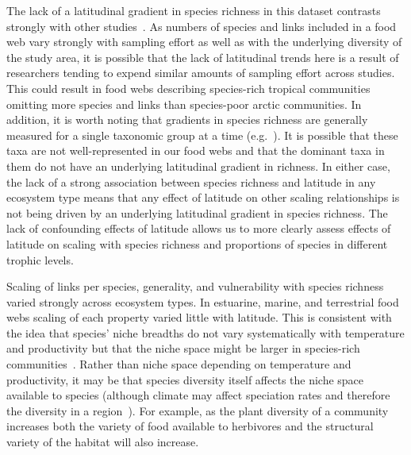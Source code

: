 \documentclass[12pt]{article}
\begin{document}
  The lack of a latitudinal gradient in species richness in this dataset
  contrasts strongly with other
  studies~\citep{Schemske2009,Macpherson2002,Kaufman1995}. As numbers of
  species and links included in a food web vary strongly with sampling effort
  as well as with the underlying diversity of the study area, it is possible
  that the lack of latitudinal trends here is a result of researchers tending
  to expend similar amounts of sampling effort across studies. This could
  result in food webs describing species-rich tropical communities omitting
  more species and links than species-poor arctic communities. In addition, it
  is worth noting that gradients in species richness are generally measured
  for a single taxonomic group at a time
  (e.g.~\citep{Schemske2009,Macpherson2002,Kaufman1995}). It is possible that
  these taxa are not well-represented in our food webs and that the dominant
  taxa in them do not have an underlying latitudinal gradient in richness.  In
  either case, the lack of a strong association between species richness and
  latitude in any ecosystem type means that any effect of latitude on other
  scaling  relationships is not being driven by an underlying  latitudinal
  gradient in species richness. The lack of confounding effects of latitude
  allows us to  more clearly assess effects of latitude on scaling with
  species richness and proportions of species in different  trophic levels.


  Scaling of links per species, generality, and vulnerability with species
  richness varied strongly across ecosystem types. In estuarine, marine, and
  terrestrial food webs scaling of each property varied little with latitude.
  This is consistent with the idea that species' niche breadths do not vary
  systematically with temperature and productivity but that the niche space
  might be larger in species-rich communities~\citep{Davies2007}. Rather than
  niche space depending on temperature and productivity, it may be that species
  diversity itself affects the niche space available to species (although climate
  may affect speciation rates and therefore the diversity in a region~\citep{Currie2004}). 
  For example, as the plant diversity of a community increases both the 
  variety of food available to herbivores and the structural variety of the habitat will also increase.
\end{document}
